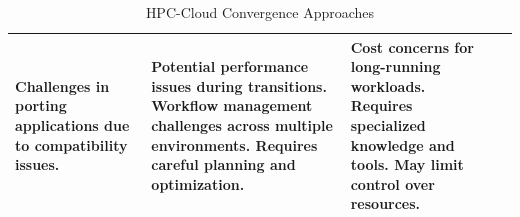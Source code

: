 \begin{table}[ht]
{\begin{tabular}{l p{5cm} p{5cm} p{5cm}}
    \newline \textbf{Challenges in porting applications} due to compatibility issues. \cite{zhao_resource_2023, liao_bridging_2021, choudhary_exascale_2021}  & \textbf{Potential performance issues} during transitions. \cite{netto_deciding_2015, endo_consideration_2022}
    \newline \textbf{Workflow management challenges} across multiple environments. \cite{balis_scientific_2021}
    \newline \textbf{Requires careful planning and optimization}. \cite{cunha_job_2016} &  \textbf{Cost concerns} for long-running workloads. \cite{netto_hpc_2018, liu_hpc_2022}
    \newline \textbf{Requires specialized knowledge and tools}. \cite{netto_hpc_2018}
    \newline  \textbf{May limit control over resources}. \cite{liu_hpc_2022} \\
    \bottomrule
\end{tabular}
}
\caption{HPC-Cloud Convergence Approaches}
\label{tab:hpc_cloud_approaches}
\end{table}

